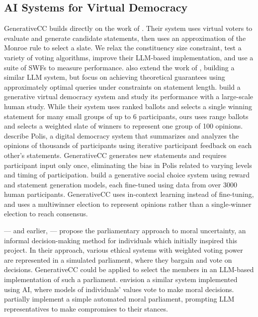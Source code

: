 \documentclass[letterpaper]{article} %
\begin{document}
\subsection{AI Systems for Virtual Democracy}
GenerativeCC builds directly on the work of \citet{fish-v2}.
Their system uses virtual voters to evaluate and generate candidate statements, then uses an approximation of the Monroe rule \citep{monroe-1995} to select a slate.
We relax the constituency size constraint, test a variety of voting algorithms, improve their LLM-based implementation, and use a suite of SWFs to measure performance.
\citet{gsc-next-gen} also extend the work of \citet{fish-v2}, building a similar LLM system, but focus on achieving theoretical guarantees using approximately optimal queries under constraints on statement length.
\citet{habermas-machine} build a generative virtual democracy system and study its performance with a large-scale human study.
While their system uses ranked ballots and selects a single winning statement for many small groups of up to 6 participants, ours uses range ballots and selects a weighted slate of winners to represent one group of 100 opinions.
\citet{polis} describe Polis, a digital democracy system that summarizes and analyzes the opinions of thousands of participants using iterative participant feedback on each other's statements.
GenerativeCC generates new statements and requires participant input only once, eliminating the bias in Polis related to varying levels and timing of participation.
\citet{bakker-consensus} build a generative social choice system using reward and statement generation models, each fine-tuned using data from over 3000 human participants.
GenerativeCC uses in-context learning \citep{xie-in-context-learning-2021} instead of fine-tuning, and uses a multiwinner election to represent opinions rather than a single-winner election to reach consensus.

\citet{newberry-moral-parliaments} --- and earlier, \citet{bostrom-moral-parliaments-2009} --- propose the parliamentary approach to moral uncertainty, an informal decision-making method for individuals which initially inspired this project.
In their approach, various ethical systems with weighted voting power are represented in a simulated parliament, where they bargain and vote on decisions.
GenerativeCC could be applied to select the members in an LLM-based implementation of such a parliament.
\citet{conitzer-2017-moral-ai} envision a similar system implemented using AI, where models of individuals' values vote to make moral decisions.
\citet{ouwerx-parliaments} partially implement a simple automated moral parliament, prompting LLM representatives to make compromises to their stances.
\end{document}
